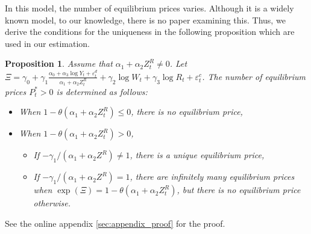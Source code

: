 \documentclass[11pt, a4paper]{article}
\newtheorem{proposition}{Proposition}
\begin{document}
In this model, the number of equilibrium prices varies. 
Although it is a widely known model, to our knowledge, there is no paper examining this.
Thus, we derive the conditions for the uniqueness in the following proposition which are used in our estimation. 
\begin{proposition}\label{prop:equilibrium_existence}
    Assume that $\alpha_1 + \alpha_2 Z^{R}_{t}\ne 0$. Let $\Xi = \gamma_0 + \gamma_1\frac{\alpha_0 + \alpha_3 \log Y_t + \varepsilon^{d}_{t}}{\alpha_1 + \alpha_2 Z^{R}_{t}} +  \gamma_2 \log W_{t} + \gamma_3 \log R_t + \varepsilon^{c}_{t}$.
    The number of equilibrium prices $P_{t}^*>0$ is determined as follows:
    \begin{itemize}
        \item When $1 - \theta (\alpha_1 + \alpha_2 Z^{R}_{t}) \le 0$, there is no equilibrium price,
        \item When $1 - \theta (\alpha_1 + \alpha_2 Z^{R}_{t}) >0$, 
        \begin{itemize}
            \item If $-\gamma_1/(\alpha_1+\alpha_2 Z^R) \ne 1$, there is a unique equilibrium price,
            \item If $-\gamma_1/(\alpha_1+\alpha_2 Z^R) =1$, there are infinitely many equilibrium prices when $\exp(\Xi) = 1 - \theta (\alpha_1 + \alpha_2 Z^{R}_{t})$, but there is no equilibrium price otherwise.
        \end{itemize}
    \end{itemize}
\end{proposition}
See the online appendix \ref{sec:appendix_proof} for the proof.




\end{document}
